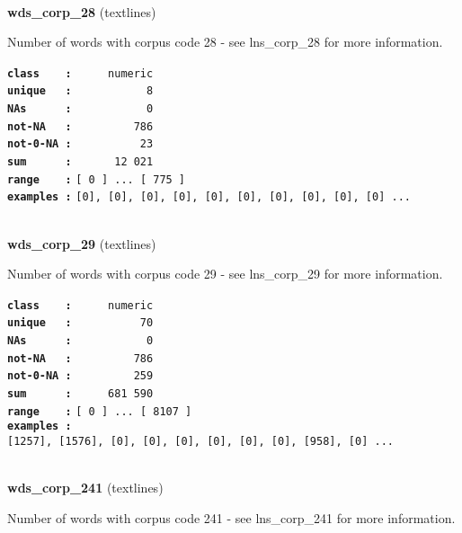 \documentclass[]{article}
\begin{document}
~

\textbf{wds\_corp\_28} (textlines)

Number of words with corpus code 28 - see lns\_corp\_28 for more
information.

\textbf{\texttt{class\ \ \ \ :}} \texttt{~~~~~numeric}\\
\textbf{\texttt{unique\ \ \ :}} \texttt{~~~~~~~~~~~8}\\
\textbf{\texttt{NAs\ \ \ \ \ \ :}} \texttt{~~~~~~~~~~~0}\\
\textbf{\texttt{not-NA\ \ \ :}} \texttt{~~~~~~~~~786}\\
\textbf{\texttt{not-0-NA\ :}} \texttt{~~~~~~~~~~23}\\
\textbf{\texttt{sum\ \ \ \ \ \ :}} \texttt{~~~~~~12~021}\\
\textbf{\texttt{range\ \ \ \ :}}
\texttt{{[}\ 0\ {]}\ ...\ {[}\ 775\ {]}}\\
\textbf{\texttt{examples\ :}}
\texttt{{[}0{]},\ {[}0{]},\ {[}0{]},\ {[}0{]},\ {[}0{]},\ {[}0{]},\ {[}0{]},\ {[}0{]},\ {[}0{]},\ {[}0{]}\ ...}\\

~

\textbf{wds\_corp\_29} (textlines)

Number of words with corpus code 29 - see lns\_corp\_29 for more
information.

\textbf{\texttt{class\ \ \ \ :}} \texttt{~~~~~numeric}\\
\textbf{\texttt{unique\ \ \ :}} \texttt{~~~~~~~~~~70}\\
\textbf{\texttt{NAs\ \ \ \ \ \ :}} \texttt{~~~~~~~~~~~0}\\
\textbf{\texttt{not-NA\ \ \ :}} \texttt{~~~~~~~~~786}\\
\textbf{\texttt{not-0-NA\ :}} \texttt{~~~~~~~~~259}\\
\textbf{\texttt{sum\ \ \ \ \ \ :}} \texttt{~~~~~681~590}\\
\textbf{\texttt{range\ \ \ \ :}}
\texttt{{[}\ 0\ {]}\ ...\ {[}\ 8107\ {]}}\\
\textbf{\texttt{examples\ :}}
\texttt{{[}1257{]},\ {[}1576{]},\ {[}0{]},\ {[}0{]},\ {[}0{]},\ {[}0{]},\ {[}0{]},\ {[}0{]},\ {[}958{]},\ {[}0{]}\ ...}\\

~

\textbf{wds\_corp\_241} (textlines)

Number of words with corpus code 241 - see lns\_corp\_241 for more
information.
\end{document}
